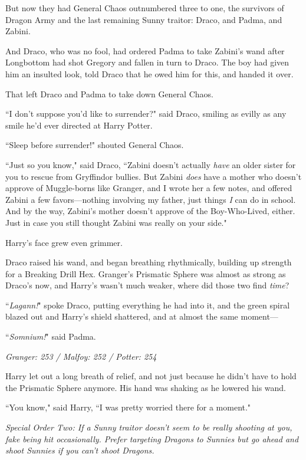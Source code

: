 But now they had General Chaos outnumbered three to one, the survivors of Dragon Army and the last remaining Sunny traitor: Draco, and Padma, and Zabini.

And Draco, who was no fool, had ordered Padma to take Zabini's wand after Longbottom had shot Gregory and fallen in turn to Draco. The boy had given him an insulted look, told Draco that he owed him for this, and handed it over.

That left Draco and Padma to take down General Chaos.

``I don't suppose you'd like to surrender?" said Draco, smiling as evilly as any smile he'd ever directed at Harry Potter.

``Sleep before surrender!" shouted General Chaos.

``Just so you know," said Draco, ``Zabini doesn't actually \emph{have} an older sister for you to rescue from Gryffindor bullies. But Zabini \emph{does} have a mother who doesn't approve of Muggle-borns like Granger, and I wrote her a few notes, and offered Zabini a few favors—nothing involving my father, just things \emph{I} can do in school. And by the way, Zabini's mother doesn't approve of the Boy-Who-Lived, either. Just in case you still thought Zabini was really on your side."

Harry's face grew even grimmer.

Draco raised his wand, and began breathing rhythmically, building up strength for a Breaking Drill Hex. Granger's Prismatic Sphere was almost as strong as Draco's now, and Harry's wasn't much weaker, where did those two find \emph{time}?

``\emph{Lagann!}" spoke Draco, putting everything he had into it, and the green spiral blazed out and Harry's shield shattered, and at almost the same moment—

``\emph{Somnium!}" said Padma.

\later

\emph{Granger: 253 / Malfoy: 252 / Potter: 254}

Harry let out a long breath of relief, and not just because he didn't have to hold the Prismatic Sphere anymore. His hand was shaking as he lowered his wand.

``You know," said Harry, ``I was pretty worried there for a moment."

\emph{Special Order Two: If a Sunny traitor doesn't seem to be really shooting at you, fake being hit occasionally. Prefer targeting Dragons to Sunnies but go ahead and shoot Sunnies if you can't shoot Dragons.}

